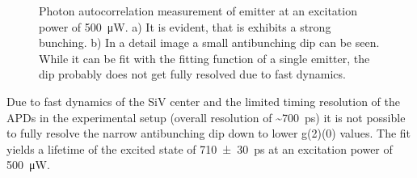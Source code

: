 	\begin{figure}[tp]
		\begin{subfigure}[t]{ 0.49\linewidth}
			\centering
			\caption{}
			\label{subfig::g2_fast_detail}
		\end{subfigure}
		\hfill
		\begin{subfigure}[t]{ 0.49\linewidth}
			\centering
			\caption{}
			\label{subfig::g2_fast_all}
		\end{subfigure}
		\caption{Photon autocorrelation measurement of emitter  at an excitation power of \SI{500}{\micro\watt}. a) It is evident, that is exhibits a strong bunching. b) In a detail image a small antibunching dip can be seen. While it can be fit with the fitting function of a single emitter, the dip probably does not get fully resolved due to fast dynamics.}
		\label{fig::g2_fast}

	\end{figure}
	Due to fast dynamics of the SiV center and the limited timing resolution of the APDs in the experimental setup (overall resolution of  \textasciitilde{}\SI{700}{ps}) it is not possible to fully resolve the narrow antibunching dip down to lower g(2)(0) values. The fit yields a lifetime of the excited state of \SI{710\pm30}{ps} at an excitation power of \SI{500}{\micro\watt}.



